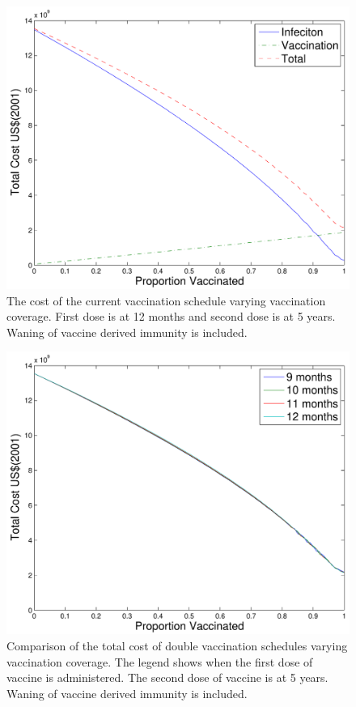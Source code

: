 \documentclass[a4paper,11pt] {scrartcl}
\begin{document}
\begin{figure}[hp]
	\centering
	\includegraphics[width=120mm]{costmeasleswaningdoublecurrent}
	\caption{The cost of the current vaccination schedule varying vaccination coverage. First dose is at 12 months and second dose is at 5 years. Waning of vaccine derived immunity is included.}
	\label{fig:resultscostmeasleswaningdoublecurrent}
\end{figure}
\begin{figure}[hp]
	\centering
	\includegraphics[width=120mm]{costmeasleswaningdouble}
	\caption{Comparison of the total cost of double vaccination schedules varying vaccination coverage. The legend shows when the first dose of vaccine is administered. The second dose of vaccine is at 5 years. Waning of vaccine derived immunity is included.}
	\label{fig:resultscostmeasleswaningdouble}
\end{figure}
\end{document}
